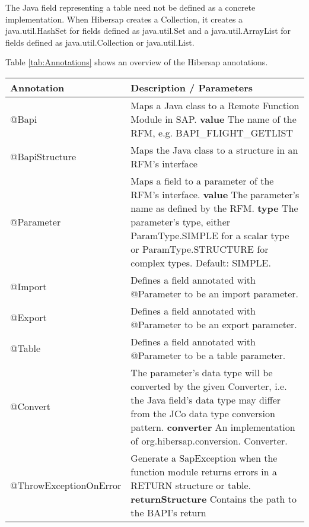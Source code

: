 The Java field representing a table need not be defined as a concrete implementation. When Hibersap creates a Collection, it creates a java.util.HashSet for fields defined as java.util.Set and a java.util.ArrayList for fields defined as java.util.Collection or java.util.List.

Table \ref{tab:Annotations} shows an overview of the Hibersap annotations.

\begin{table}[H]
  \centering
   \begin{tabularx}{\textwidth}{ l X }
    \toprule 
    \textbf{Annotation}     & \textbf{Description / Parameters} \\ 
    \midrule
    @Bapi                   & Maps a Java class to a Remote Function Module in SAP.
                              \textbf{value} The name of the RFM, e.g. BAPI\_FLIGHT\_GETLIST
    \\ 
    @BapiStructure          & Maps the Java class to a structure in an RFM's interface 
    \\
    @Parameter              & Maps a field to a parameter of the RFM's interface.
                              \textbf{value} The parameter's name as defined by the RFM. 
                              \textbf{type} The parameter's type, either ParamType.SIMPLE for a 
                                            scalar type or ParamType.STRUCTURE for complex types. 
                                            Default: SIMPLE. 
    \\
    @Import                 & Defines a field annotated with @Parameter to be an import parameter. 
    \\
    @Export                 & Defines a field annotated with @Parameter to be an export parameter. 
    \\
    @Table                  & Defines a field annotated with @Parameter to be a table parameter. 
    \\
    @Convert                & The parameter's data type will be converted by the given Converter, 
                              i.e. the Java field's data type may differ from 
                              the JCo data type conversion pattern.
                              \textbf{converter} An implementation of org.hibersap.conversion.
                              Converter. 
    \\
    @ThrowExceptionOnError  & Generate a SapException when the function module returns
                              errors in a RETURN structure or table. 
                              \textbf{returnStructure} Contains the path to the BAPI's return

\end{tabularx}
\end{table}
